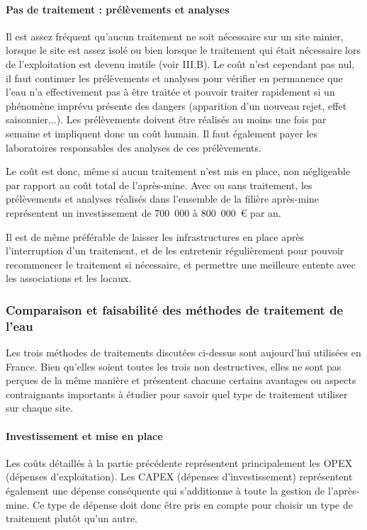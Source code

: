 \documentclass{article}
\begin{document}
\paragraph{Pas de traitement : prélèvements et analyses}

Il est assez fréquent qu’aucun traitement ne soit nécessaire sur un site minier, lorsque le site est assez isolé ou bien lorsque le traitement qui était nécessaire lors de l’exploitation est devenu inutile (voir III.B). Le coût n’est cependant pas nul, il faut continuer les prélèvements et analyses pour vérifier en permanence que l’eau n’a effectivement pas à être traitée et pouvoir traiter rapidement si un phénomène imprévu présente des dangers (apparition d’un nouveau rejet, effet saisonnier...). Les prélèvements doivent être réalisés au moins une fois par semaine et impliquent donc un coût humain. Il faut également payer les laboratoires responsables des analyses de ces prélèvements.

Le coût est donc, même si aucun traitement n’est mis en place, non négligeable  par rapport au coût total de l’après-mine. Avec ou sans traitement, les prélèvements et analyses réalisés dans l’ensemble de la filière après-mine représentent un investissement de 700~000 à 800~000~\euro{} par an.

Il est de même préférable de laisser les infrastructures en place après l'interruption d’un traitement, et de les entretenir régulièrement pour pouvoir recommencer le traitement si nécessaire, et permettre  une meilleure entente avec les associations et les locaux. 


\subsubsection{Comparaison et faisabilité des méthodes de traitement de l'eau}
Les trois méthodes de traitements discutées ci-dessus sont aujourd’hui utilisées en France. Bien qu’elles soient toutes les trois non destructives, elles ne sont pas perçues de la même manière et présentent chacune certains avantages ou aspects contraignants importants à étudier pour savoir quel type de traitement utiliser sur chaque site.


\paragraph{Investissement et mise en place}

Les coûts détaillés à la partie précédente représentent principalement les OPEX (dépenses d’exploitation). Les CAPEX (dépenses d’investissement) représentent également une dépense conséquente qui s'additionne à toute la gestion de l’après-mine. Ce type de dépense doit donc être pris en compte pour choisir un type de traitement plutôt qu’un autre.
\end{document}
